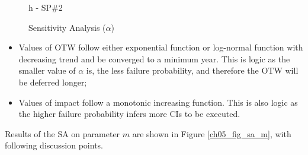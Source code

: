 \begin{figure}[!htb]
\begin{minipage}[b]{0.5\linewidth}
		\caption*{h - SP\#2}
	\end{minipage}
	\caption{Sensitivity Analysis ($\alpha$)}
	\label{ch05_fig_sa_alpha}
\end{figure}

\begin{itemize}
\item Values of OTW follow either exponential function or log-normal function with decreasing trend and be converged to a minimum year. This is logic as the smaller value of $\alpha$ is, the less failure probability, and therefore the OTW will be deferred longer;
\item Values of impact follow a monotonic increasing function. This is also logic as the higher failure probability infers more CIs to be executed. 
\end{itemize}

Results of the SA on parameter $m$ are shown in Figure \ref{ch05_fig_sa_m}, with following discussion points.


